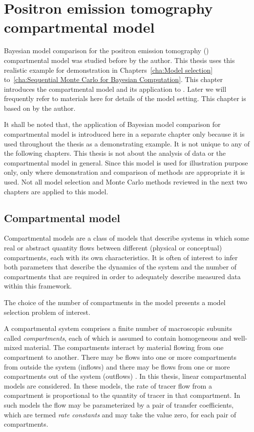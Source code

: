 \chapter{Positron emission tomography compartmental model}
\label{cha:Positron emission tomography compartmental model}

Bayesian model comparison for the positron emission tomography (\pet) compartmental model was studied before by the author. This thesis uses this realistic example for demonstration in Chapters~\ref{cha:Model selection} to~\ref{cha:Sequential Monte Carlo for Bayesian Computation}. This chapter introduces the compartmental model and its application to \pet. Later we will frequently refer to materials here for details of the model setting. This chapter is based on \cite{Zhou2013} by the author.

\begin{draftpar}
It shall be noted that, the application of Bayesian model comparison for \pet compartmental model is introduced here in a separate chapter only because it is used throughout the thesis as a demonstrating example. It is not unique to any of the following chapters. This thesis is not about the analysis of \pet data or the compartmental model in general. Since this model is used for illustration purpose only, only where demonstration and comparison of methods are appropriate it is used. Not all model selection and Monte Carlo methods reviewed in the next two chapters are applied to this model.
\end{draftpar}

\section{Compartmental model}
\label{sec:Compartmental model}

Compartmental models are a class of models that describe systems in which some real or abstract quantity flows between different (physical or conceptual) compartments, each with its own characteristics. It is often of interest to infer both parameters that describe the dynamics of the system and the number of compartments that are required in order to adequately describe measured data within this framework.
\begin{draftpar}
The choice of the number of compartments in the model presents a model selection problem of interest.
\end{draftpar}

A compartmental system comprises a finite number of macroscopic subunits called \emph{compartments}, each of which is assumed to contain homogeneous and well-mixed material. The compartments interact by material flowing from one compartment to another. There may be flows into one or more compartments from outside the system (inflows) and there may be flows from one or more compartments out of the system (outflows) \cite{Jacquez:1996gc}. In this thesis, linear compartmental models are considered. In these models, the rate of tracer flow from a compartment is proportional to the quantity of tracer in that compartment. In such models the flow may be parameterized by a pair of transfer coefficients, which are termed \emph{rate constants} and may take the value zero, for each pair of compartments.

